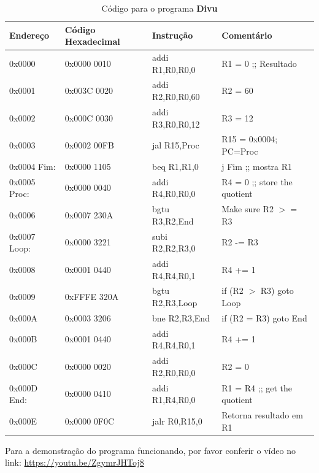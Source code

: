 \documentclass[12pt]{article}
\begin{document}
\begin{table}[H]
    \centering
    \caption{Código para o programa \textbf{Divu}}
    \begin{tabular}{|l|l|l|l|}\hline
        \textbf{Endereço} & \textbf{Código Hexadecimal} & \textbf{Instrução} & \textbf{Comentário} \\\hline
        0x0000       & 0x0000 0010 & addi R1,R0,R0,0  & R1 = 0 ;; Resultado           \\\hline
        0x0001       & 0x003C 0020 & addi R2,R0,R0,60 & R2 = 60                       \\\hline
        0x0002       & 0x000C 0030 & addi R3,R0,R0,12 & R3 = 12                       \\\hline
        0x0003       & 0x0002 00FB & jal R15,Proc     & R15 = 0x0004; PC=Proc         \\\hline
        0x0004 Fim:  & 0x0000 1105 & beq R1,R1,0      & j Fim ;; mostra R1            \\\hline
        0x0005 Proc: & 0x0000 0040 & addi R4,R0,R0,0  & R4 = 0 ;; store the quotient  \\\hline
        0x0006       & 0x0007 230A & bgtu R3,R2,End   & Make sure R2 $>=$ R3          \\\hline
        0x0007 Loop: & 0x0000 3221 & subi R2,R2,R3,0  & R2 -= R3                      \\\hline
        0x0008       & 0x0001 0440 & addi R4,R4,R0,1  & R4 += 1                       \\\hline
        0x0009       & 0xFFFE 320A & bgtu R2,R3,Loop  & if (R2 $>$ R3) goto Loop      \\\hline
        0x000A       & 0x0003 3206 & bne  R2,R3,End   & if (R2 \!= R3) goto End       \\\hline
        0x000B       & 0x0001 0440 & addi R4,R4,R0,1  & R4 += 1                       \\\hline
        0x000C       & 0x0000 0020 & addi R2,R0,R0,0  & R2 = 0                        \\\hline
        0x000D End:  & 0x0000 0410 & addi R1,R4,R0,0  & R1 = R4 ;; get the quotient   \\\hline
        0x000E       & 0x0000 0F0C & jalr R0,R15,0    & Retorna resultado em R1       \\\hline
    \end{tabular}\label{tab:programs:divu}
\end{table}

Para a demonstração do programa funcionando, por favor conferir o vídeo no link:
\href{https://youtu.be/ZgymrJHToj8}{https://youtu.be/ZgymrJHToj8}
\end{document}
